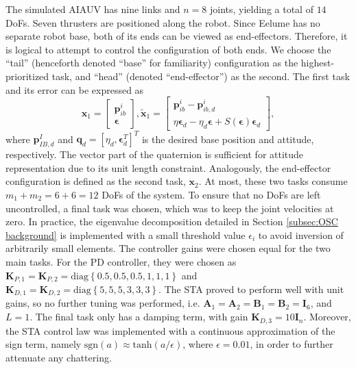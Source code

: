 \documentclass[../main.tex]{subfiles}
\begin{document}
The simulated AIAUV has nine links and $n=8$ joints, yielding a total of $14$ DoFs. Seven thrusters are positioned along the robot. Since Eelume has no separate robot base, both of its ends can be viewed as end-effectors. Therefore, it is logical to attempt to control the configuration of both ends. We choose the ``tail'' (henceforth denoted ``base'' for familiarity) configuration as the highest-prioritized task, and ``head'' (denoted ``end-effector'') as the second. The first task and its error can be expressed as
\begin{equation}
    \bm{x}_1 =
    \begin{bmatrix}
        \bm{p}^i_{ib} \\
        \bm{\epsilon}
    \end{bmatrix},
    \tilde{\bm{x}}_1 =
    \begin{bmatrix}
        \bm{p}^i_{ib} - \bm{p}^i_{ib,d} \\
        \eta \bm{\epsilon}_d - \eta_d \bm{\epsilon} + S{\left(\bm{\epsilon}\right)} \bm{\epsilon}_d
    \end{bmatrix},
\end{equation}
where $\bm{p}^I_{IB,d}$ and $\bm{q}_d = \left[\eta_d, \bm{\epsilon}_d^T\right]^T$ is the desired base position and attitude, respectively. The vector part of the quaternion is sufficient for attitude representation due to its unit length constraint. Analogously, the end-effector configuration is defined as the second task, $\bm{x}_2$. At most, these two tasks consume $m_1+m_2=6+6=12$ DoFs of the system. To ensure that no DoFs are left uncontrolled, a final task was chosen, which was to keep the joint velocities at zero. In practice, the eigenvalue decomposition detailed in Section \ref{subsec:OSC background} is implemented with a small threshold value $\epsilon_i$ to avoid inversion of arbitrarily small elements. The controller gains were chosen equal for the two main tasks. For the PD controller, they were chosen as $\bm{K}_{P, 1} = \bm{K}_{P, 2} = \mathrm{diag}\left\{0.5, 0.5, 0.5, 1, 1, 1\right\}$ and $\bm{K}_{D, 1} = \bm{K}_{D, 2} = \mathrm{diag}\left\{5, 5, 5, 3, 3, 3\right\}$. The STA proved to perform well with unit gains, so no further tuning was performed, i.e. $\bm{A}_1  = \bm{A}_2 = \bm{B}_1 = \bm{B}_2 = \bm{I}_{6}$, and $L = 1$. The final task only has a damping term, with gain $\bm{K}_{D, 3} = 10\bm{I}_n$. Moreover, the STA control law was implemented with a continuous approximation of the sign term, namely $\mathrm{sgn}(a) \approx \mathrm{tanh}(a/\epsilon)$, where $\epsilon = 0.01$, in order to further attenuate any chattering.
\end{document}
